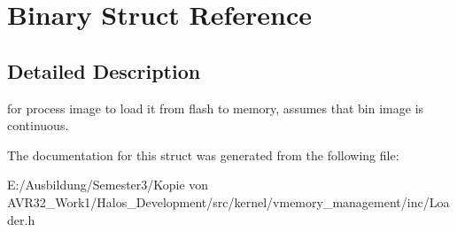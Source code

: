 \hypertarget{struct_binary}{
\section{Binary Struct Reference}
\label{struct_binary}
}


\subsection{Detailed Description}
for process image to load it from flash to memory, assumes that bin image is continuous. 

The documentation for this struct was generated from the following file:\begin{CompactItemize}
\item 
E:/Ausbildung/Semester3/Kopie von AVR32\_\-Work1/Halos\_\-Development/src/kernel/vmemory\_\-management/inc/Loader.h\end{CompactItemize}
